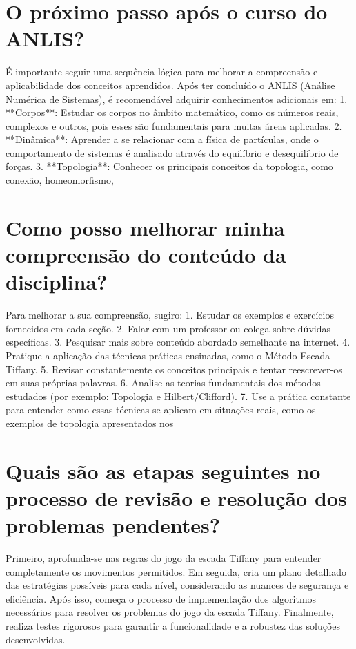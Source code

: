 \documentclass[11pt,a4paper]{article}
\begin{document}
\section{O próximo passo após o curso do ANLIS?}
É importante seguir uma sequência lógica para melhorar a compreensão e aplicabilidade dos conceitos aprendidos. Após ter concluído o ANLIS (Análise Numérica de Sistemas), é recomendável adquirir conhecimentos adicionais em: 1. **Corpos**: Estudar os corpos no âmbito matemático, como os números reais, complexos e outros, pois esses são fundamentais para muitas áreas aplicadas. 2. **Dinâmica**: Aprender a se relacionar com a física de partículas, onde o comportamento de sistemas é analisado através do equilíbrio e desequilíbrio de forças. 3. **Topologia**: Conhecer os principais conceitos da topologia, como conexão, homeomorfismo,

\section{Como posso melhorar minha compreensão do conteúdo da disciplina?}
Para melhorar a sua compreensão, sugiro: 1. Estudar os exemplos e exercícios fornecidos em cada seção. 2. Falar com um professor ou colega sobre dúvidas específicas. 3. Pesquisar mais sobre conteúdo abordado semelhante na internet. 4. Pratique a aplicação das técnicas práticas ensinadas, como o Método Escada Tiffany. 5. Revisar constantemente os conceitos principais e tentar reescrever-os em suas próprias palavras. 6. Analise as teorias fundamentais dos métodos estudados (por exemplo: Topologia e Hilbert/Clifford). 7. Use a prática constante para entender como essas técnicas se aplicam em situações reais, como os exemplos de topologia apresentados nos

\section{Quais são as etapas seguintes no processo de revisão e resolução dos problemas pendentes?}
Primeiro, aprofunda-se nas regras do jogo da escada Tiffany para entender completamente os movimentos permitidos. Em seguida, cria um plano detalhado das estratégias possíveis para cada nível, considerando as nuances de segurança e eficiência. Após isso, começa o processo de implementação dos algoritmos necessários para resolver os problemas do jogo da escada Tiffany. Finalmente, realiza testes rigorosos para garantir a funcionalidade e a robustez das soluções desenvolvidas.
\end{document}
